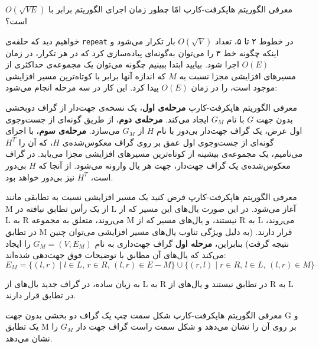 \begin{itemframe}{‌معرفی الگوریتم هاپکرفت-کارپ}
\itm
امًا چطور زمان اجرای الگوریتم برابر با $O(\sqrt{V E})$ است؟

خواهیم دید که حلقه‌ی \texttt{repeat} در خطوط ۲ تا ۵، تعداد $O(\sqrt{V})$ بار تکرار می‌شود و اینکه چگونه خط ۳ را می‌توان به‌گونه‌ای پیاده‌سازی کرد که در هر تکرار، در زمان $O(E)$ اجرا شود.
\itm
بیایید ابتدا ببینیم چگونه می‌توان یک مجموعه‌ی حداکثری از مسیرهای افزایشی مجزا نسبت به $M$ که اندازه آنها برابر با کوتاه‌ترین مسیر افزایشی موجود است، را در زمان $O(E)$ پیدا کرد. این کار در سه مرحله انجام می‌شود:

\end{itemframe}


\begin{itemframe}{‌معرفی الگوریتم هاپکرفت-کارپ}
\itm
\textbf{مرحله‌ی اول}،
یک نسخه‌ی جهت‌دار از گراف دوبخشی بدون جهت $G$ با نام $G_M$ ایجاد می‌کند.
\itm
\textbf{مرحله‌ی دوم}،
از طریق گونه‌ای از جست‌وجوی اول عرض، یک گراف جهت‌دار بی‌دور با نام $H$ از $G_M$ می‌سازد.
\itm
\textbf{مرحله‌ی سوم}،
با اجرای گونه‌ای از جست‌وجوی اول عمق بر روی گراف معکوس‌شده‌ی $H$، که آن را $H^T$ می‌نامیم، یک مجموعه‌ی بیشینه از کوتاه‌ترین مسیرهای افزایشی مجزا می‌یابد.
\itm
در گراف معکوس‌شده‌ی یک گراف جهت‌دار، جهت هر یال وارونه می‌شود. از آنجا که $H$ بی‌دور است، $H^T$ نیز بی‌دور خواهد بود.
\end{itemframe}


\begin{itemframe}{‌معرفی الگوریتم هاپکرفت-کارپ}
\itm
فرض کنید یک مسیر افزایشی نسبت به تطابقی مانند M از یک رأس تطابق نیافته در L آغاز می‌شود.
\itm
در این صورت یال‌های این مسیر که از L به R می‌روند، متعلق به مجموعه M نیستند، و یال‌های مسیر که از R به L می‌روند، در تطابق M قرار دارند. (به دلیل ویژگی تناوب یال‌های مسیر افزایشی می‌توان چنین نتیجه گرفت)
\itm
بنابراین، \textbf{مرحله اول} گراف جهت‌داری به نام
$G_M = (V, E_M)$
را ایجاد می‌کند که یال‌های آن مطابق با توضیحات فوق جهت‌دهی شده‌اند:
$$
E_M = \{ (l, r) \mid l \in L,\, r \in R,\, (l, r) \in E - M \} \cup \{ (r, l) \mid r \in R,\, l \in L,\, (l, r) \in M \}
$$

\itm
به زبان ساده، در گراف جدید یال‌های از L به R در تطابق نیستند و یال‌های از R به L در تطابق قرار دارند.
\end{itemframe}


\begin{itemframe}{‌معرفی الگوریتم هاپکرفت-کارپ}
\itm
شکل سمت چپ یک گراف دو بخشی بدون جهت G و یک تطابق M بر روی آن را نشان می‌دهد و شکل سمت راست گراف جهت دار $G_M$ را نشان می‌دهد.
\begin{figure}[h]
  \centering
  \begin{minipage}{0.45\textwidth}
  \end{minipage}
  \hfill
  \begin{minipage}{0.45\textwidth}
  \end{minipage}
\end{figure}

\end{itemframe}


